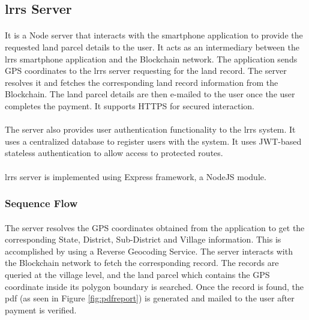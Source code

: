 \documentclass[12pt]{article}
\begin{document}
    \subsection{\acrshort{lrrs} Server}
        \paragraph{}
        It is a Node server that interacts with the smartphone application to provide the requested land parcel details to the user. It acts as an intermediary between the \acrshort{lrrs} smartphone application and the Blockchain network. The application sends GPS coordinates to the \acrshort{lrrs} server requesting for the land record. The server resolves it and fetches the corresponding land record information from the Blockchain. The land parcel details are then e-mailed to the user once the user completes the payment. It supports HTTPS for secured interaction.
        
        \paragraph{}
        The server also provides user authentication functionality to the \acrshort{lrrs} system. It uses a centralized database to register users with the system. It uses JWT-based stateless authentication to allow access to protected routes.

        \paragraph{}
        \acrshort{lrrs} server is implemented using Express framework, a NodeJS module.
        
        \subsubsection{Sequence Flow}
        \paragraph{}
        The server resolves the GPS coordinates obtained from the application to get the corresponding State, District, Sub-District and Village information. This is accomplished by using a Reverse Geocoding Service. The server interacts with the Blockchain network to fetch the corresponding record. The records are queried at the village level, and the land parcel which contains the GPS coordinate inside its polygon boundary is searched. Once the record is found, the \acrshort{pdf} (as seen in Figure \ref{fig:pdfreport}) is generated and mailed to the user after payment is verified.
\end{document}
